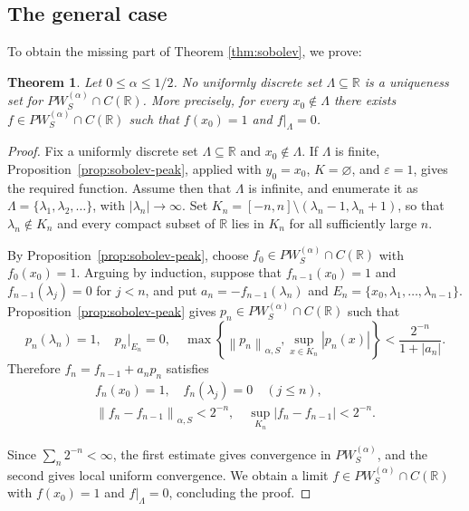 \documentclass[reqno,a4paper,12pt]{amsart}
\numberwithin{equation}{section}
\newtheorem{theorem}[definition]{Theorem}
\def\R{{\mathbb R}}
\newcommand\1{\mathds{1}}
\newcommand{\norm}[1]{\left\lVert #1 \right\rVert}
\begin{document}
\subsection{The general case}
To obtain the missing part of Theorem \ref{thm:sobolev}, we prove:
\begin{theorem}\label{thm:sobolev-negative}
Let \(0\leq\alpha\leq1/2\). No uniformly discrete set
\(\Lambda\subseteq\R\) is a uniqueness set for
\(PW^{(\alpha)}_S\cap C(\R)\). More precisely, for every
\(x_0\notin\Lambda\) there exists \(f\in PW^{(\alpha)}_S\cap C(\R)\) such
that \(f(x_0)=1\) and \(f|_\Lambda=0\).
\end{theorem}

\begin{proof}
Fix a uniformly discrete set \(\Lambda\subseteq\R\) and
\(x_0\notin\Lambda\). If \(\Lambda\) is finite, Proposition~\ref{prop:sobolev-peak}, applied with \(y_0=x_0\), \(K=\varnothing\), and
\(\varepsilon=1\), gives the required function. Assume then that \(\Lambda\)
is infinite, and enumerate it as \(\Lambda=\{\lambda_1,\lambda_2,\ldots\}\),
with \(|\lambda_n|\to\infty\). Set
\(K_n=[-n,n]\setminus(\lambda_n-1,\lambda_n+1)\), so that
\(\lambda_n\notin K_n\) and every compact subset of \(\R\) lies in
\(K_n\) for all sufficiently large \(n\).

By Proposition~\ref{prop:sobolev-peak}, choose
\(f_0\in PW^{(\alpha)}_S\cap C(\R)\) with \(f_0(x_0)=1\). Arguing by
induction, suppose that \(f_{n-1}(x_0)=1\) and
\(f_{n-1}(\lambda_j)=0\) for \(j<n\), and put
\(a_n=-f_{n-1}(\lambda_n)\) and
\(E_n=\{x_0,\lambda_1,\ldots,\lambda_{n-1}\}\).
Proposition~\ref{prop:sobolev-peak} gives
\(p_n\in PW^{(\alpha)}_S\cap C(\R)\) such that
\[
    p_n(\lambda_n)=1,
    \quad p_n|_{E_n}=0,
    \quad
    \max\left\{\norm{p_n}_{\alpha,S},
        \sup_{x\in K_n}|p_n(x)|\right\}
    <\frac{2^{-n}}{1+|a_n|}.
\]
Therefore \(f_n=f_{n-1}+a_np_n\) satisfies
\[
    \begin{gathered}
        f_n(x_0)=1,\quad f_n(\lambda_j)=0\quad(j\leq n),\\
        \norm{f_n-f_{n-1}}_{\alpha,S}<2^{-n},\quad
        \sup_{K_n}|f_n-f_{n-1}|<2^{-n}.
    \end{gathered}
\]

Since \(\sum_n2^{-n}<\infty\), the first estimate gives convergence in
\(PW^{(\alpha)}_S\), and the second gives local uniform convergence. We obtain
a limit \(f\in PW^{(\alpha)}_S\cap C(\R)\) with
\(f(x_0)=1\) and \(f|_\Lambda=0\), concluding the proof.
\end{proof}
\end{document}
